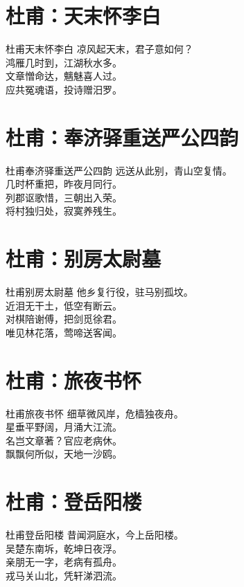 \documentclass[12pt,oneside,a5paper]{book}
\begin{document}
\chapter{杜甫：天末怀李白}
\begin{poemzh}{杜甫}{天末怀李白}
凉风起天末，君子意如何？\\
鸿雁几时到，江湖秋水多。\\
文章憎命达，魑魅喜人过。\\
应共冤魂语，投诗赠汨罗。\\ 
\end{poemzh}

\chapter{杜甫：奉济驿重送严公四韵}
\begin{poemzh}{杜甫}{奉济驿重送严公四韵}
远送从此别，青山空复情。\\
几时杯重把，昨夜月同行。\\
列郡讴歌惜，三朝出入荣。\\
将村独归处，寂寞养残生。\\ 
\end{poemzh}

\chapter{杜甫：别房太尉墓}
\begin{poemzh}{杜甫}{别房太尉墓}
他乡复行役，驻马别孤坟。\\
近泪无干土，低空有断云。\\
对棋陪谢傅，把剑觅徐君。\\
唯见林花落，莺啼送客闻。\\ 
\end{poemzh}

\chapter{杜甫：旅夜书怀}
\begin{poemzh}{杜甫}{旅夜书怀}
细草微风岸，危樯独夜舟。\\
星垂平野阔，月涌大江流。\\
名岂文章著？官应老病休。\\
飘飘何所似，天地一沙鸥。\\ 
\end{poemzh}

\chapter{杜甫：登岳阳楼}
\begin{poemzh}{杜甫}{登岳阳楼}
昔闻洞庭水，今上岳阳楼。\\
吴楚东南坼，乾坤日夜浮。\\
亲朋无一字，老病有孤舟。\\
戎马关山北，凭轩涕泗流。\\ 
\end{poemzh}
\end{document}
